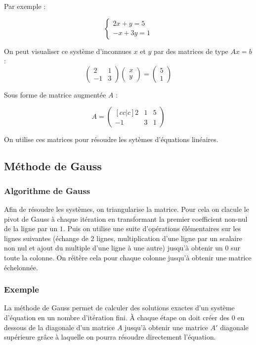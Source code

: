 \documentclass{article}
\begin{document}
Par exemple :

\[\begin{cases}
  2x + y = 5 \\
  -x + 3y = 1
 \end{cases}\]

On peut visualiser ce système d'inconnues $x$ et $y$ par des matrices de type $Ax=b$ :
\[\begin{pmatrix}
  2  & 1 \\
  -1 & 3
 \end{pmatrix}
 \begin{pmatrix}
  x \\
  y
 \end{pmatrix}
 =
 \begin{pmatrix}
  5 \\
  1
 \end{pmatrix}\]

Sous forme de matrice augmentée $A$ :

\[ A =
 \begin{pmatrix}[cc|c]
  2  & 1 & 5 \\
  -1 & 3 & 1
 \end{pmatrix}\]

On utilise ces matrices pour résoudre les sytèmes d'équations linéaires.

\subsection{Méthode de Gauss}

\subsubsection{Algorithme de Gauss}

Afin de résoudre les systèmes, on triangularise la matrice. Pour cela on clacule le pivot de Gauss à chaque itération en transformant la premier coefficient non-nul de la ligne par un $1$.
Puis on utilise une suite d'opérations élémentaires sur les lignes suivantes (échange de 2 lignes, multiplication d'une ligne par un scalaire non nul et ajout du multiple d'une ligne à une autre) jusqu'à obtenir un $0$ sur toute la colonne.
On réitère cela pour chaque colonne jusqu'à obtenir une matrice échelonnée.

\subsubsection{Exemple}

La méthode de Gauss permet de calculer des solutions exactes d'un système d'équation en un nombre d'itération fini.
À chaque étape on doit créer des $0$ en dessous de la diagonale d'un matrice $A$ jusqu'à obtenir une matrice $A'$ diagonale supérieure grâce à laquelle on pourra résoudre directement l'équation.
\end{document}
